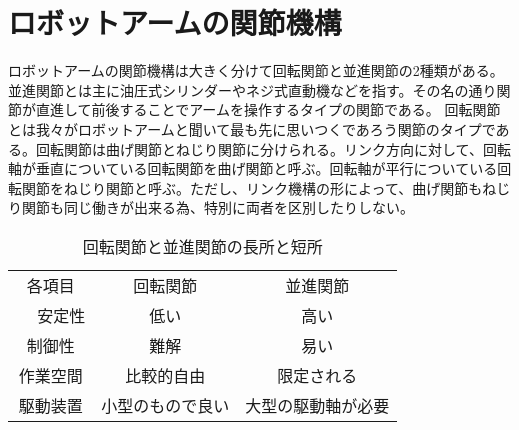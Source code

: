 \documentclass[12pt,a4j]{jarticle}
\begin{document}
\section{ロボットアームの関節機構}
ロボットアームの関節機構は大きく分けて回転関節と並進関節の2種類がある。並進関節とは主に油圧式シリンダーやネジ式直動機などを指す。その名の通り関節が直進して前後することでアームを操作するタイプの関節である。
回転関節とは我々がロボットアームと聞いて最も先に思いつくであろう関節のタイプである。回転関節は曲げ関節とねじり関節に分けられる。リンク方向に対して、回転軸が垂直についている回転関節を曲げ関節と呼ぶ。回転軸が平行についている回転関節をねじり関節と呼ぶ。ただし、リンク機構の形によって、曲げ関節もねじり関節も同じ働きが出来る為、特別に両者を区別したりしない。
\begin{table}[htb]
 \begin{center}
  \caption{回転関節と並進関節の長所と短所}
  \begin{tabular}{|c|c|c|} \hline
   各項目&回転関節&並進関節\\　\hline \hline
   安定性&低い &高い \\ \hline
   制御性&難解 &易い \\ \hline
   作業空間&比較的自由 &限定される \\ \hline
   駆動装置&小型のもので良い &大型の駆動軸が必要 \\ \hline
  \end{tabular}
 \end{center}
\end{table}
\end{document}
